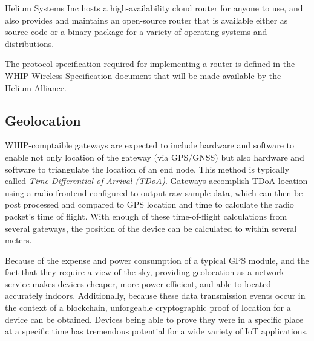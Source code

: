 \documentclass[letterpaper,11pt]{article}
\begin{document}
Helium Systems Inc hosts a high-availability cloud router for anyone to use, and also provides and maintains an open-source router that is available either as source code or a binary package for a variety of operating systems and distributions.\newline

The protocol specification required for implementing a router is defined in the WHIP Wireless Specification document that will be made available by the Helium Alliance\cite{alliance}.

\subsection{Geolocation} \label{geolocation}

WHIP-comptaible gateways are expected to include hardware and software to enable not only location of the gateway (via GPS/GNSS) but also hardware and software to triangulate the location of an end node. This method is typically called \textit{Time Differential of Arrival (TDoA)}. Gateways accomplish TDoA location using a radio frontend configured to output raw sample data, which can then be post processed and compared to GPS location and time to calculate the radio packet's time of flight. With enough of these time-of-flight calculations from several gateways, the position of the device can be calculated to within several meters.\newline

Because of the expense and power consumption of a typical GPS module, and the fact that they require a view of the sky, providing geolocation as a network service makes devices cheaper, more power efficient, and able to located accurately indoors. Additionally, because these data transmission events occur in the context of a blockchain, unforgeable cryptographic proof of location for a device can be obtained. Devices being able to prove they were in a specific place at a specific time has tremendous potential for a wide variety of IoT applications.\newline
\end{document}
